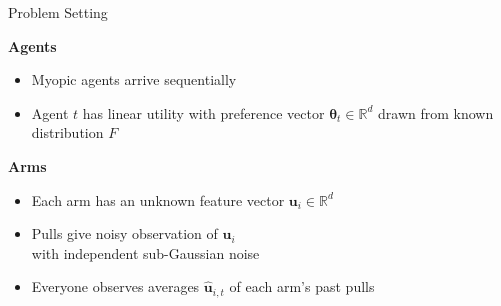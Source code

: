 \documentclass[serif]{beamer}
\begin{document}
%
%
%
%
\begin{frame}{Problem Setting}

\textbf{Agents}
\begin{itemize}[label=\textbullet]
\item Myopic agents arrive sequentially
\item Agent $t$ has linear utility with preference vector $\bm{\theta}_t\in \mathbb{R}^{d}$ drawn from known distribution $F$
\end{itemize}
\vspace{0.5cm}

\textbf{Arms}
\begin{itemize}[label=\textbullet]
\item Each arm has an unknown feature vector $\bm{u}_i\in \mathbb{R}^{d}$
\item Pulls give noisy observation of $\bm{u}_i$ \\ with independent sub-Gaussian noise
\item Everyone observes averages $\hat{\bm{u}}_{i,t}$ of each arm's past pulls
\end{itemize}

\end{frame}
\end{document}

